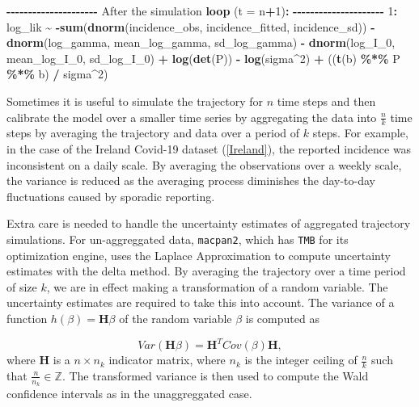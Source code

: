 \documentclass[
11pt, %
oneside, %
english, %
singlespacing, %
]{macthesis} %
\newenvironment{Shaded}{\begin{snugshade}}{\end{snugshade}}
\newcommand{\AttributeTok}[1]{\textcolor[rgb]{0.13,0.29,0.53}{#1}}
\newcommand{\DecValTok}[1]{\textcolor[rgb]{0.00,0.00,0.81}{#1}}
\newcommand{\FunctionTok}[1]{\textcolor[rgb]{0.13,0.29,0.53}{\textbf{#1}}}
\newcommand{\NormalTok}[1]{#1}
\newcommand{\SpecialCharTok}[1]{\textcolor[rgb]{0.81,0.36,0.00}{\textbf{#1}}}
\begin{document}
\begin{Shaded}
\begin{Highlighting}[]
\SpecialCharTok{{-}{-}{-}{-}{-}{-}{-}{-}{-}{-}{-}{-}{-}{-}{-}{-}{-}{-}{-}{-}{-}}
\NormalTok{After the simulation }\FunctionTok{loop}\NormalTok{ (}\AttributeTok{t =}\NormalTok{ n}\SpecialCharTok{+}\DecValTok{1}\NormalTok{)}\SpecialCharTok{:}
\SpecialCharTok{{-}{-}{-}{-}{-}{-}{-}{-}{-}{-}{-}{-}{-}{-}{-}{-}{-}{-}{-}{-}{-}}
\DecValTok{1}\SpecialCharTok{:}\NormalTok{ log\_lik }\SpecialCharTok{\textasciitilde{}} \SpecialCharTok{{-}}\FunctionTok{sum}\NormalTok{(}\FunctionTok{dnorm}\NormalTok{(incidence\_obs, incidence\_fitted, incidence\_sd)) }\SpecialCharTok{{-}}
              \FunctionTok{dnorm}\NormalTok{(log\_gamma, mean\_log\_gamma, sd\_log\_gamma) }\SpecialCharTok{{-}} 
              \FunctionTok{dnorm}\NormalTok{(log\_I\_0, mean\_log\_I\_0, sd\_log\_I\_0) }\SpecialCharTok{+}
              \FunctionTok{log}\NormalTok{(}\FunctionTok{det}\NormalTok{(P)) }\SpecialCharTok{{-}}
              \FunctionTok{log}\NormalTok{(sigma}\SpecialCharTok{\^{}}\DecValTok{2}\NormalTok{) }\SpecialCharTok{+} 
\NormalTok{              ((}\FunctionTok{t}\NormalTok{(b) }\SpecialCharTok{\%*\%}\NormalTok{ P }\SpecialCharTok{\%*\%}\NormalTok{ b) }\SpecialCharTok{/}\NormalTok{ sigma}\SpecialCharTok{\^{}}\DecValTok{2}\NormalTok{)}
\end{Highlighting}
\end{Shaded}

Sometimes it is useful to simulate the trajectory for \(n\) time steps and then calibrate the model over a smaller time series by aggregating the data into \(\frac{n}{k}\) time steps by averaging the trajectory and data over a period of \(k\) steps. For example, in the case of the Ireland Covid-19 dataset (\ref{Ireland}), the reported incidence was inconsistent on a daily scale. By averaging the observations over a weekly scale, the variance is reduced as the averaging process diminishes the day-to-day fluctuations caused by sporadic reporting.

Extra care is needed to handle the uncertainty estimates of aggregated trajectory simulations. For un-aggreggated data, \texttt{macpan2}, which has \texttt{TMB} for its optimization engine, uses the Laplace Approximation to compute uncertainty estimates with the delta method. By averaging the trajectory over a time period of size \(k\), we are in effect making a transformation of a random variable. The uncertainty estimates are required to take this into account. The variance of a function \(h(\beta) = \mathbf{H} \beta\) of the random variable \(\beta\) is computed as

\[
Var(\mathbf{H} \beta) = \mathbf{H}^T Cov(\beta) \mathbf{H},
\]
where \(\mathbf{H}\) is a \(n \times n_k\) indicator matrix, where \(n_k\) is the integer ceiling of \(\frac{n}{k}\) such that \(\frac{n}{n_k} \in \mathbb{Z}\). The transformed variance is then used to compute the Wald confidence intervals as in the unaggreggated case.
\end{document}

